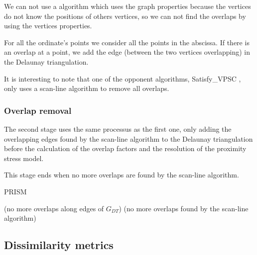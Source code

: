 \documentclass[12pt]{report}
\begin{document}
We can not use a algorithm which uses the graph properties because the vertices do not know the positions of others vertices, so we can not find the overlaps by using the vertices properties.

For all the ordinate's points we consider all the points in the abscissa. If there is an overlap at a point, we add the edge (between the two vertices overlapping) in the Delaunay triangulation. 


\bigskip
It is interesting to note that one of the opponent algorithms, Satisfy\_VPSC \cite{VPSC06}, only uses a scan-line algorithm to remove all overlaps.

\subsubsection{Overlap removal}

The second stage uses the same processus as the first one, only adding the overlapping edges found by the scan-line algorithm to the Delaunay triangulation before the calculation of the overlap factors and the resolution of the proximity stress model.

This stage ends when no more overlaps are found by the scan-line algorithm.

\bigskip
\begin{algorithm}[H]
\caption{PRISM}
	 
(no more overlaps along edges of $G_{DT}$)
\BlankLine
{}	
(no more overlaps found by the scan-line algorithm)
\end{algorithm}

\subsection{Dissimilarity metrics}
\end{document}
